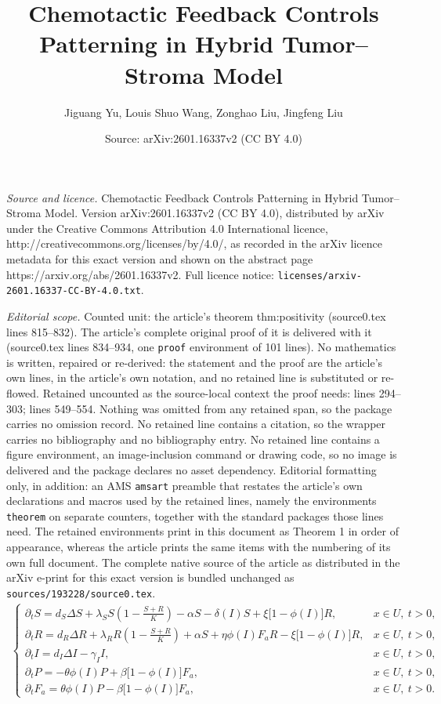 \documentclass[10pt,a4paper]{amsart}
\title{Chemotactic Feedback Controls Patterning in Hybrid Tumor–Stroma Model}
\author{Jiguang Yu, Louis Shuo Wang, Zonghao Liu, Jingfeng Liu}
\date{Source: arXiv:2601.16337v2 (CC BY 4.0)}
\begin{document}
\maketitle

\noindent\emph{Source and licence.} Chemotactic Feedback Controls Patterning in Hybrid Tumor–Stroma Model. Version arXiv:2601.16337v2 (CC BY 4.0), distributed by arXiv under the Creative Commons Attribution 4.0 International licence, http://creativecommons.org/licenses/by/4.0/, as recorded in the arXiv licence metadata for this exact version and shown on the abstract page https://arxiv.org/abs/2601.16337v2. Full licence notice: \texttt{licenses/arxiv-2601.16337-CC-BY-4.0.txt}.\par\smallskip

\noindent\textit{Editorial scope.} Counted unit: the article's theorem thm:positivity (source0.tex lines 815--832). The article's complete original proof of it is delivered with it (source0.tex lines 834--934, one \texttt{proof} environment of 101 lines). No mathematics is written, repaired or re-derived: the statement and the proof are the article's own lines, in the article's own notation, and no retained line is substituted or re-flowed.  Retained uncounted as the source-local context the proof needs: lines 294--303; lines 549--554.  Nothing was omitted from any retained span, so the package carries no omission record.  No retained line contains a citation, so the wrapper carries no bibliography and no bibliography entry.  No retained line contains a figure environment, an image-inclusion command or drawing code, so no image is delivered and the package declares no asset dependency.  Editorial formatting only, in addition: an AMS \texttt{amsart} preamble that restates the article's own declarations and macros used by the retained lines, namely the environments \texttt{theorem} on separate counters, together with the standard packages those lines need.  The retained environments print in this document as Theorem 1 in order of appearance, whereas the article prints the same items with the numbering of its own full document.  The complete native source of the article as distributed in the arXiv e-print for this exact version is bundled unchanged as \texttt{sources/193228/source0.tex}.
\begin{align}
\label{eq:system}
\begin{cases}
\partial_{t} S = d_{S}\Delta S + \lambda_{S} S \left(1 - \tfrac{S+R}{K}\right) - \alpha S - \delta(I)S + \xi \bigl[1 - \phi(I)\bigr]R, & x\in U,\ t>0, \\[4pt]
\partial_{t} R = d_{R}\Delta R + \lambda_{R} R \left(1 - \tfrac{S+R}{K}\right) + \alpha S + \eta \phi(I)F_aR - \xi \bigl[1 - \phi(I)\bigr]R, & x\in U,\ t>0, \\[4pt]
\partial_{t} I = d_{I}\Delta I - \gamma_{I}I, & x\in U,\ t>0, \\[4pt]
\partial_{t} P = -\theta \phi(I)P + \beta \bigl[1 - \phi(I)\bigr]F_a, & x \in U,\ t>0, \\[4pt]
\partial_{t} F_a = \theta \phi(I)P - \beta \bigl[1 - \phi(I)\bigr]F_a, & x \in U,\ t>0.
\end{cases}
\end{align}
\end{document}
